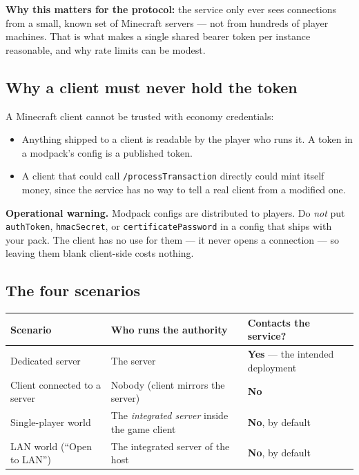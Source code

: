 \documentclass[11pt,a4paper]{article}
\newcommand{\code}[1]{\texttt{\small #1}}
\newcommand{\keybox}[2]{%
  \par\vspace{0.5em}\noindent
  \colorbox{#1}{%
    \begin{minipage}{\dimexpr\linewidth-2\fboxsep\relax}
    \vspace{0.35em}\small #2\vspace{0.35em}
    \end{minipage}}%
  \par\vspace{0.5em}}
\newcommand{\note}[1]{\keybox{omceWash}{#1}}
\newcommand{\warn}[1]{\keybox{omceWarnWash}{#1}}
\begin{document}
\note{\textbf{Why this matters for the protocol:} the service only ever sees connections from a
small, known set of Minecraft servers --- not from hundreds of player machines. That is what makes
a single shared bearer token per instance reasonable, and why rate limits can be modest.}

\subsection{Why a client must never hold the token}
\label{sec:notoken}

A Minecraft client cannot be trusted with economy credentials:

\begin{itemize}
\item Anything shipped to a client is readable by the player who runs it. A token in a modpack's
      config is a published token.
\item A client that could call \code{/processTransaction} directly could mint itself money, since
      the service has no way to tell a real client from a modified one.
\end{itemize}

\warn{\textbf{Operational warning.} Modpack configs are distributed to players. Do \emph{not} put
\code{authToken}, \code{hmacSecret}, or \code{certificatePassword} in a config that ships with your
pack. The client has no use for them --- it never opens a connection --- so leaving them blank
client-side costs nothing.}

\subsection{The four scenarios}

\begin{tabularx}{\linewidth}{L{5.4cm} L{5.0cm} X}
\toprule
\textbf{Scenario} & \textbf{Who runs the authority} & \textbf{Contacts the service?}\\
\midrule
Dedicated server                    & The server                        & \textbf{Yes} --- the intended deployment\\
Client connected to a server        & Nobody (client mirrors the server) & \textbf{No}\\
Single-player world                 & The \emph{integrated server} inside the game client & \textbf{No}, by default\\
LAN world (``Open to LAN'')         & The integrated server of the host  & \textbf{No}, by default\\
\bottomrule
\end{tabularx}
\end{document}
